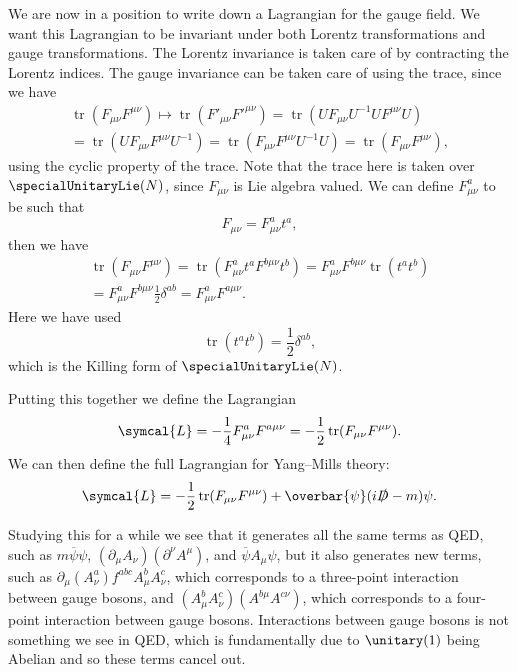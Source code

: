 \documentclass[fleqn]{NotesClass}
\newcommand{\diracadjoint}[1]{\overbar{#1}}
\newcommand{\covariantDerivative}{D}
\newcommand{\lagrangianDensity}{\symcal{L}}
\DeclareMathOperator{\tr}{tr}
\begin{document}
    We are now in a position to write down a Lagrangian for the gauge field.
    We want this Lagrangian to be invariant under both Lorentz transformations and gauge transformations.
    The Lorentz invariance is taken care of by contracting the Lorentz indices.
    The gauge invariance can be taken care of using the trace, since we have
    \begin{multline}
        \tr(F_{\mu\nu}F^{\mu\nu}) \mapsto \tr(F'_{\mu\nu}F'^{\mu\nu}) = \tr(UF_{\mu\nu}U^{-1}UF^{\mu\nu}U)\\
        = \tr(UF_{\mu\nu}F^{\mu\nu}U^{-1}) = \tr(F_{\mu\nu}F^{\mu\nu}U^{-1}U) = \tr(F_{\mu\nu}F^{\mu\nu}),
    \end{multline}
    using the cyclic property of the trace.
    Note that the trace here is taken over \(\specialUnitaryLie(N)\), since \(F_{\mu\nu}\) is Lie algebra valued.
    We can define \(F^a_{\mu\nu}\) to be such that
    \begin{equation}
        F_{\mu\nu} = F^a_{\mu\nu}t^a,
    \end{equation}
    then we have
    \begin{multline}
        \tr(F_{\mu\nu}F^{\mu\nu}) = \tr(F^a_{\mu\nu}t^aF^{b\mu\nu}t^b) = F^a_{\mu\nu}F^{b\mu\nu}\tr(t^at^b)\\
        = F^a_{\mu\nu}F^{b\mu\nu}\frac{1}{2}\delta^{ab} = F^a_{\mu\nu}F^{a\mu\nu}.
    \end{multline}
    Here we have used
    \begin{equation}
        \tr(t^at^b) = \frac{1}{2}\delta^{ab},
    \end{equation}
    which is the Killing form of \(\specialUnitaryLie(N)\).
    
    Putting this together we define the Lagrangian
    \begin{equation}
        \lagrangianDensity = -\frac{1}{4}F^a_{\mu\nu}F^{a\mu\nu} = -\frac{1}{2}\tr(F_{\mu\nu}F^{\mu\nu}).
    \end{equation}
    We can then define the full Lagrangian for Yang--Mills theory:
    \begin{equation}
        \lagrangianDensity = -\frac{1}{2}\tr(F_{\mu\nu}F^{\mu\nu}) + \diracadjoint{\psi}(i\slashed{\covariantDerivative} - m)\psi.
    \end{equation}
    
    Studying this for a while we see that it generates all the same terms as QED, such as \(m\diracadjoint{\psi}\psi\), \((\partial_\mu A_\nu)(\partial^\nu A^\mu)\), and \(\diracadjoint{\psi}A_\mu\psi\), but it also generates new terms, such as \(\partial_\mu(A_\nu^a)f^{abc}A_\mu^bA_\nu^c\), which corresponds to a three-point interaction between gauge bosons, and \((A_\mu^b A_\nu^c)(A^{b\mu}A^{c\nu})\), which corresponds to a four-point interaction between gauge bosons.
    Interactions between gauge bosons is not something we see in QED, which is fundamentally due to \(\unitary(1)\) being Abelian and so these terms cancel out.
    
\end{document}
